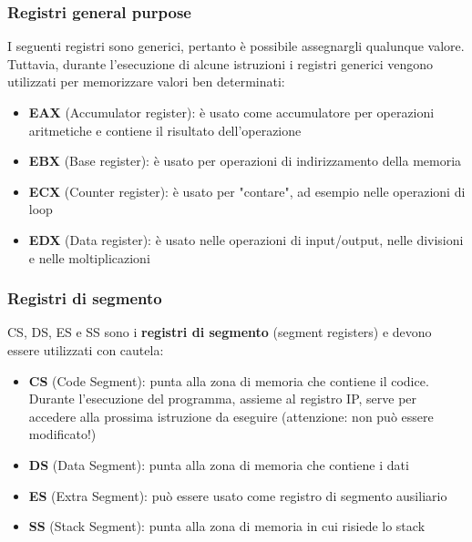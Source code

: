 \documentclass[a4paper]{article}
\theoremstyle{break}
\theoremstyle{break}
\theoremstyle{break}
\theoremstyle{break}
\begin{document}
\subsubsection{Registri general purpose}
I seguenti registri sono generici, pertanto è possibile assegnargli qualunque valore. Tuttavia,
durante l'esecuzione di alcune istruzioni i registri generici vengono utilizzati per
memorizzare valori ben determinati:
\begin{itemize}
	\item \textbf{EAX} (Accumulator register): è usato come accumulatore per
	      operazioni aritmetiche e contiene il risultato dell'operazione
	\item \textbf{EBX} (Base register): è usato per operazioni di indirizzamento della
	      memoria
	\item \textbf{ECX} (Counter register):  è usato per "contare", ad esempio nelle
	      operazioni di loop
	\item \textbf{EDX} (Data register): è usato nelle operazioni di input/output, nelle
	      divisioni e nelle moltiplicazioni

\end{itemize}

\subsubsection{Registri di segmento}
CS, DS, ES e SS sono i \textbf{registri di segmento} (segment registers) e devono
essere utilizzati con cautela:
\begin{itemize}
	\item \textbf{CS} (Code Segment): punta alla zona di memoria che contiene il codice.
	      Durante l'esecuzione del programma, assieme al registro IP, serve per
	      accedere alla prossima istruzione da eseguire (attenzione: non può
	      essere modificato!)
	\item \textbf{DS} (Data Segment): punta alla zona di memoria che contiene i dati
	\item \textbf{ES} (Extra Segment):  può essere usato come registro di segmento
	      ausiliario
	\item \textbf{SS} (Stack Segment): punta alla zona di memoria in cui risiede lo stack
\end{itemize}
\end{document}
